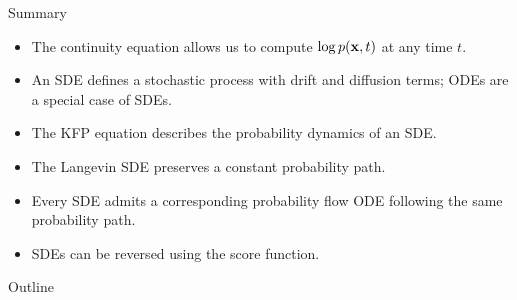 \documentclass{beamer}
\begin{document}
\begin{frame}{Summary}
	\begin{itemize}
		\item The continuity equation allows us to compute $\log p(\mathbf{x}, t)$ at any time $t$.
		\vfill
		\item An SDE defines a stochastic process with drift and diffusion terms; ODEs are a special case of SDEs.
		\vfill
		\item The KFP equation describes the probability dynamics of an SDE.
		\vfill
		\item The Langevin SDE preserves a constant probability path.
		\vfill
		\item Every SDE admits a corresponding probability flow ODE following the same probability path.
		\vfill
		\item SDEs can be reversed using the score function.
	\end{itemize}
\end{frame}


\begin{frame}
\titlepage
	\resetonslide
\end{frame}






\begin{frame}{Outline}
	\tableofcontents
\end{frame}
\end{document}
